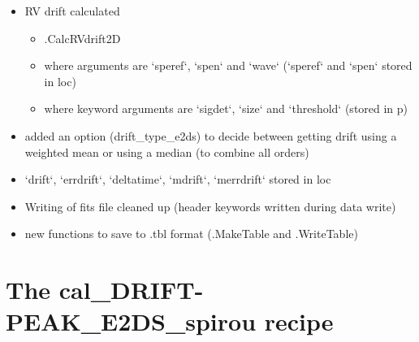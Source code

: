 \begin{itemize}
\item RV drift calculated
	\begin{itemize}
	\item \spirouRV.CalcRVdrift2D
	\item where arguments are `speref`, `spen` and `wave` (`speref` and `spen` stored in loc)
	\item where keyword arguments are `sigdet`, `size` and `threshold` (stored in p)
	\end{itemize}

\item added an option (drift\_type\_e2ds) to decide between getting drift using a weighted mean or using a median (to combine all orders)

\item `drift`, `errdrift`, `deltatime`, `mdrift`, `merrdrift` stored in loc

\item Writing of fits file cleaned up (header keywords written during data write)

\item new functions to save to .tbl format (\spirouImage.MakeTable and \spirouImage.WriteTable)

\end{itemize}


\section{The cal\_DRIFT-PEAK\_E2DS\_spirou recipe}
\label{ch:changelog:At4:cal_DRIFT-PEAK_E2DS_spirou}

